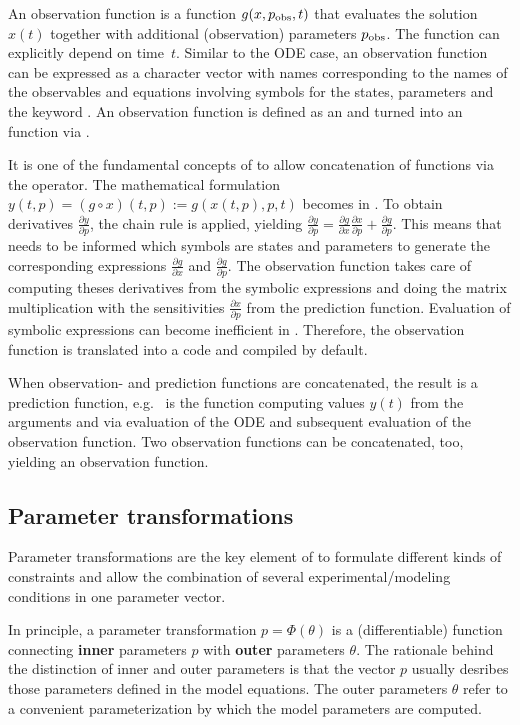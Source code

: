 \documentclass[article]{jss}
\begin{document}
An observation function is a function $g(x, p_{\rm obs}, t)$ that evaluates the solution $x(t)$ together with additional (observation) parameters $p_{\rm obs}$. The function can explicitly depend on time~$t$. Similar to the ODE case, an observation function can be expressed as a character vector with names corresponding to the names of the observables and equations involving symbols for the states, parameters and the keyword . An observation function is defined as an  and turned into an  function via .

It is one of the fundamental concepts of  to allow concatenation of functions via the  operator. The mathematical formulation $y(t, p) = (g\circ x)(t, p):= g(x(t, p), p, t)$ becomes  in . To obtain derivatives $\frac{\partial y}{\partial p}$, the chain rule is applied, yielding $\frac{\partial y}{\partial p} = \frac{\partial g}{\partial x}\frac{\partial x}{\partial p} + \frac{\partial g}{\partial p}$. This means that  needs to be informed which symbols are states and parameters to generate the corresponding expressions $\frac{\partial g}{\partial x}$ and $\frac{\partial g}{\partial p}$. The observation function  takes care of computing theses derivatives from the symbolic expressions and doing the matrix multiplication with the sensitivities $\frac{\partial x}{\partial p}$ from the prediction function. Evaluation of symbolic expressions can become inefficient in . Therefore, the observation function is translated into a  code and compiled by default.

When observation- and prediction functions are concatenated, the result is a prediction function, e.g.~ is the  function computing values $y(t)$ from the arguments  and  via evaluation of the ODE and subsequent evaluation of the observation function. Two observation functions can be concatenated, too, yielding an observation function.

\subsection{Parameter transformations}

Parameter transformations are the key element of  to formulate different kinds of constraints and allow the combination of several experimental/modeling conditions in one parameter vector.

In principle, a parameter transformation $p = \Phi(\theta)$ is a (differentiable) function connecting \textbf{inner} parameters $p$ with \textbf{outer} parameters $\theta$. The rationale behind the distinction of inner and outer parameters is that the vector $p$ usually desribes those parameters defined in the model equations. The outer parameters $\theta$ refer to a convenient parameterization by which the model parameters are computed.
\end{document}
